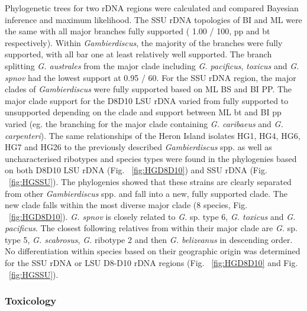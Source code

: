 \documentclass[12pt]{article}
\begin{document}
Phylogenetic trees for two rDNA regions were calculated and compared Bayesian inference and maximum likelihood. The SSU rDNA  topologies of BI and ML were the same with all major branches fully supported ( 1.00 / 100, pp and bt respectively). Within \emph{Gambierdiscus}, the majority of the branches were fully supported, with all bar one at least relatively well supported. The branch splitting \emph{G. australes} from the major clade including \emph{G. pacificus}, \emph{toxicus} and \emph{G. spnov} had the lowest support at 0.95 / 60.
For the SSU rDNA region, the major clades of \textit{Gambierdiscus }were fully supported based on ML BS and BI PP. The major clade support for the D8D10 LSU rDNA varied from fully supported to unsupported depending on the clade and support between ML bt and BI pp varied (eg. the branching for the major clade containing \emph{G. caribaeus} and \emph{G. carpenteri}). The same relationships of the Heron Island isolates HG1, HG4, HG6, HG7 and HG26 to the previously described \emph{Gambierdiscus} spp. as well as uncharacterised ribotypes and species types were found in the phylogenies based on both D8D10 LSU rDNA (Fig. ~\ref{fig:HGD8D10}) and SSU rDNA (Fig. ~\ref{fig:HGSSU}). The phylogenies showed that these strains are clearly separated from other \emph{Gambierdiscus} spp. and fall into a new, fully supported clade. The new clade falls within the most diverse major clade (8 species, Fig. ~\ref{fig:HGD8D10}). \emph{G. spnov} is closely related to \emph{G.} sp. type 6, \emph{G. toxicus} and \emph{G. pacificus}. The closest following relatives from within their major clade are \emph{G.} sp. type 5, \emph{G. scabrosus}, \emph{G.} ribotype 2 and then \emph{G. belizeanus} in descending order. \\
No differentiation within species based on their geographic origin was determined for the SSU rDNA or LSU D8-D10 rDNA regions (Fig. ~\ref{fig:HGD8D10} and Fig. ~\ref{fig:HGSSU}).


\subsubsection{Toxicology}
\end{document}
